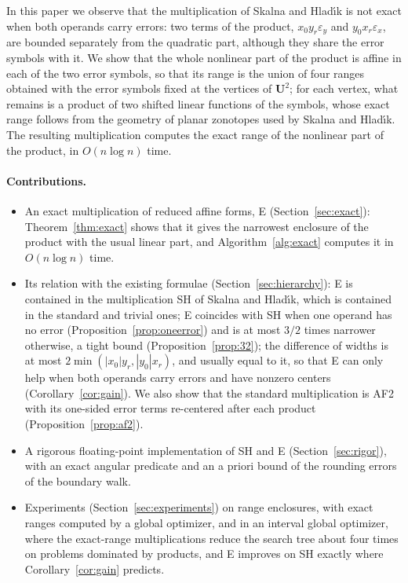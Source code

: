 \documentclass[10pt]{article}
\theoremstyle{definition}
\newcommand{\U}{\mathbf{U}}
\newcommand{\eps}{\varepsilon}
\newcommand{\ex}{\eps_x}
\newcommand{\ey}{\eps_y}
\begin{document}
In this paper we observe that the multiplication of Skalna and Hlad\'{\i}k is not exact when both operands carry errors: two terms of the product, $x_0 y_r\ey$ and $y_0 x_r\ex$, are bounded separately from the quadratic part, although they share the error symbols with it. We show that the whole nonlinear part of the product is affine in each of the two error symbols, so that its range is the union of four ranges obtained with the error symbols fixed at the vertices of $\U^2$; for each vertex, what remains is a product of two shifted linear functions of the symbols, whose exact range follows from the geometry of planar zonotopes used by Skalna and Hlad\'{\i}k. The resulting multiplication computes the exact range of the nonlinear part of the product, in $O(n\log n)$ time.

\paragraph{Contributions.}
\begin{itemize}
\item An exact multiplication of reduced affine forms, E (Section~\ref{sec:exact}): Theorem~\ref{thm:exact} shows that it gives the narrowest enclosure of the product with the usual linear part, and Algorithm~\ref{alg:exact} computes it in $O(n\log n)$ time.
\item Its relation with the existing formulae (Section~\ref{sec:hierarchy}): E is contained in the multiplication SH of Skalna and Hlad\'{\i}k, which is contained in the standard and trivial ones; E coincides with SH when one operand has no error (Proposition~\ref{prop:oneerror}) and is at most $3/2$ times narrower otherwise, a tight bound (Proposition~\ref{prop:32}); the difference of widths is at most $2\min(|x_0|y_r,|y_0|x_r)$, and usually equal to it, so that E can only help when both operands carry errors and have nonzero centers (Corollary~\ref{cor:gain}). We also show that the standard multiplication is AF2~\cite{messine2002extentions} with its one-sided error terms re-centered after each product (Proposition~\ref{prop:af2}).
\item A rigorous floating-point implementation of SH and E (Section~\ref{sec:rigor}), with an exact angular predicate and an a priori bound of the rounding errors of the boundary walk.
\item Experiments (Section~\ref{sec:experiments}) on range enclosures, with exact ranges computed by a global optimizer, and in an interval global optimizer, where the exact-range multiplications reduce the search tree about four times on problems dominated by products, and E improves on SH exactly where Corollary~\ref{cor:gain} predicts.
\end{itemize}
\end{document}
